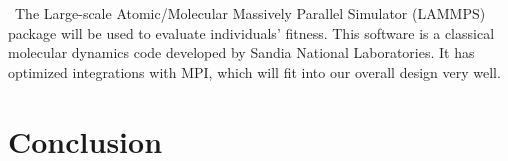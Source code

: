 \documentclass[letterpaper, 12pt]{article}
\begin{document}
\begin{flushleft}
~\newline The Large-scale Atomic/Molecular Massively Parallel Simulator (LAMMPS) package will be used to evaluate individuals' fitness.  This software is a classical molecular dynamics code developed by Sandia National Laboratories.  It has optimized integrations with MPI, which will fit into our overall design very well.




\section*{Conclusion}

\newpage
\printbibliography

\end{flushleft}
\end{document}
